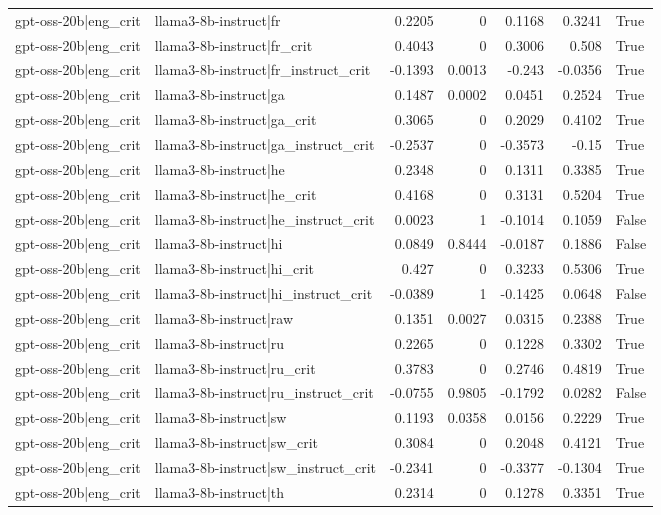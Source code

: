 \begin{table}
\begin{tabular}{l l r r r r l}
gpt-oss-20b|eng_crit & llama3-8b-instruct|fr & 0.2205 & 0 & 0.1168 & 0.3241 & True \\
gpt-oss-20b|eng_crit & llama3-8b-instruct|fr_crit & 0.4043 & 0 & 0.3006 & 0.508 & True \\
gpt-oss-20b|eng_crit & llama3-8b-instruct|fr_instruct_crit & -0.1393 & 0.0013 & -0.243 & -0.0356 & True \\
gpt-oss-20b|eng_crit & llama3-8b-instruct|ga & 0.1487 & 0.0002 & 0.0451 & 0.2524 & True \\
gpt-oss-20b|eng_crit & llama3-8b-instruct|ga_crit & 0.3065 & 0 & 0.2029 & 0.4102 & True \\
gpt-oss-20b|eng_crit & llama3-8b-instruct|ga_instruct_crit & -0.2537 & 0 & -0.3573 & -0.15 & True \\
gpt-oss-20b|eng_crit & llama3-8b-instruct|he & 0.2348 & 0 & 0.1311 & 0.3385 & True \\
gpt-oss-20b|eng_crit & llama3-8b-instruct|he_crit & 0.4168 & 0 & 0.3131 & 0.5204 & True \\
gpt-oss-20b|eng_crit & llama3-8b-instruct|he_instruct_crit & 0.0023 & 1 & -0.1014 & 0.1059 & False \\
gpt-oss-20b|eng_crit & llama3-8b-instruct|hi & 0.0849 & 0.8444 & -0.0187 & 0.1886 & False \\
gpt-oss-20b|eng_crit & llama3-8b-instruct|hi_crit & 0.427 & 0 & 0.3233 & 0.5306 & True \\
gpt-oss-20b|eng_crit & llama3-8b-instruct|hi_instruct_crit & -0.0389 & 1 & -0.1425 & 0.0648 & False \\
gpt-oss-20b|eng_crit & llama3-8b-instruct|raw & 0.1351 & 0.0027 & 0.0315 & 0.2388 & True \\
gpt-oss-20b|eng_crit & llama3-8b-instruct|ru & 0.2265 & 0 & 0.1228 & 0.3302 & True \\
gpt-oss-20b|eng_crit & llama3-8b-instruct|ru_crit & 0.3783 & 0 & 0.2746 & 0.4819 & True \\
gpt-oss-20b|eng_crit & llama3-8b-instruct|ru_instruct_crit & -0.0755 & 0.9805 & -0.1792 & 0.0282 & False \\
gpt-oss-20b|eng_crit & llama3-8b-instruct|sw & 0.1193 & 0.0358 & 0.0156 & 0.2229 & True \\
gpt-oss-20b|eng_crit & llama3-8b-instruct|sw_crit & 0.3084 & 0 & 0.2048 & 0.4121 & True \\
gpt-oss-20b|eng_crit & llama3-8b-instruct|sw_instruct_crit & -0.2341 & 0 & -0.3377 & -0.1304 & True \\
gpt-oss-20b|eng_crit & llama3-8b-instruct|th & 0.2314 & 0 & 0.1278 & 0.3351 & True \\

\end{tabular}
\end{table}
